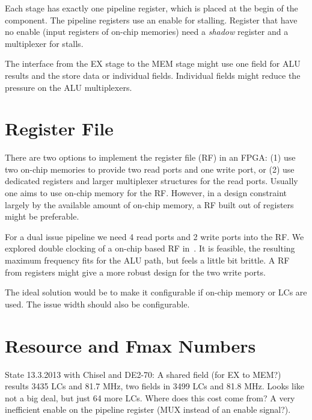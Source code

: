 \documentclass[a4paper,fontsize=10pt,twoside,DIV15,BCOR12mm,headinclude=true,footinclude=false,pagesize,bibtotoc]{scrbook}
\newcommand{\comment}[3]{

\textsf{\textbf{#1}} {\color{#3}#2}}
\newcommand{\martin}[1]{\comment{Martin}{#1}{Blue}}
\renewcommand{\martin}[1]{}
\begin{document}
Each stage has exactly one pipeline register, which is placed at the begin
of the component. The pipeline registers use an enable for stalling.
Register that have no enable (input registers of on-chip memories) need
a \emph{shadow} register and a multiplexer for stalls.

The interface from the EX stage to the MEM stage might use one
field for ALU results and the store data or individual fields. Individual
fields might reduce the pressure on the ALU multiplexers.
\martin{Update to the current implementation -- check for difference.}


\section{Register File}

There are two options to implement the register file (RF) in an FPGA: (1) use
two on-chip memories to provide two read ports and one write port, or (2)
use dedicated registers and larger multiplexer structures for the read
ports. Usually one aims to use on-chip memory for the RF. However,
in a design constraint largely by the available amount of on-chip memory,
a RF built out of registers might be preferable.

For a dual issue pipeline we need 4 read ports and 2 write ports into the RF.
We explored double clocking of a on-chip based RF in~\cite{patmos:ppes2011}.
It is feasible, the resulting maximum frequency fits for the ALU path, but feels
a little bit brittle. A RF from registers might give a more robust design for the
two write ports.

The ideal solution would be to make it configurable if on-chip memory or
LCs are used. The issue width should also be configurable.




\section{Resource and Fmax Numbers}

State 13.3.2013 with Chisel and DE2-70: A shared field (for EX to MEM?) results 3435 LCs
and 81.7 MHz, two fields in 3499 LCs and 81.8 MHz. Looks like not a big deal,
but just 64 more LCs. Where does this cost come from? A very inefficient
enable on the pipeline register (MUX instead of an enable signal?).

\martin{Update with reduced ALU muxes and also with additional second
ALU pipeline (forwarding). Is dual issue configurable?}
\end{document}

